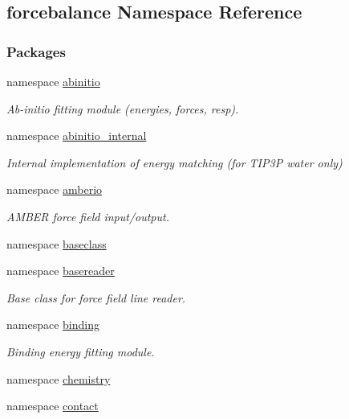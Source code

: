 \hypertarget{namespaceforcebalance}{\subsection{forcebalance \-Namespace \-Reference}
\label{namespaceforcebalance}
}
\subsubsection*{\-Packages}
\begin{DoxyCompactItemize}
\item 
namespace \hyperlink{namespaceforcebalance_1_1abinitio}{abinitio}
\begin{DoxyCompactList}\small\item\em \-Ab-\/initio fitting module (energies, forces, resp). \end{DoxyCompactList}\item 
namespace \hyperlink{namespaceforcebalance_1_1abinitio__internal}{abinitio\-\_\-internal}
\begin{DoxyCompactList}\small\item\em \-Internal implementation of energy matching (for \-T\-I\-P3\-P water only) \end{DoxyCompactList}\item 
namespace \hyperlink{namespaceforcebalance_1_1amberio}{amberio}
\begin{DoxyCompactList}\small\item\em \-A\-M\-B\-E\-R force field input/output. \end{DoxyCompactList}\item 
namespace \hyperlink{namespaceforcebalance_1_1baseclass}{baseclass}
\item 
namespace \hyperlink{namespaceforcebalance_1_1basereader}{basereader}
\begin{DoxyCompactList}\small\item\em \-Base class for force field line reader. \end{DoxyCompactList}\item 
namespace \hyperlink{namespaceforcebalance_1_1binding}{binding}
\begin{DoxyCompactList}\small\item\em \-Binding energy fitting module. \end{DoxyCompactList}\item 
namespace \hyperlink{namespaceforcebalance_1_1chemistry}{chemistry}
\item 
namespace \hyperlink{namespaceforcebalance_1_1contact}{contact}

\end{DoxyCompactItemize}
